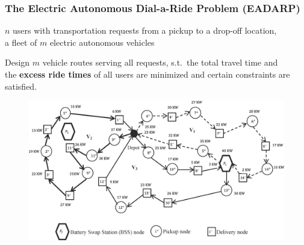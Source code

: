 \documentclass[aspectratio=1610]{beamer}
\newcommand{\important}[1]{{\color{green!60!black}#1}}
\begin{document}

\begin{frame}
	\frametitle{The Electric Autonomous Dial-a-Ride Problem (EADARP)}

\citep{Bongiovanni:2019}
	
 $n$ users with transportation requests from a pickup to a drop-off location,\\ a fleet of $m$ \important{electric autonomous} vehicles 

\medskip
{} Design $m$ vehicle routes serving all requests, s.t.\ the \important{total travel time and\\ the \textbf{excess ride times}} of all users are minimized and certain constraints are satisfied.
  
\begin{figure}
	\centering
	\includegraphics[scale=0.70]{graphics/darp-bss-example.jpg}
\end{figure}
	
\end{frame}
\end{document}
